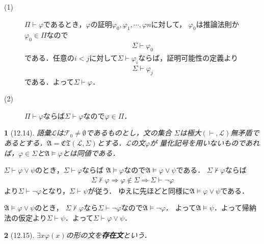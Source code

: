 \documentclass[a4j,10.5pt,oneside,openany]{jsbook}
\theoremstyle{mystyle}
\newtheorem{thm}{\color{DarkMidnightBlue}{定理}}[section]
\newtheorem{dfn}[thm]{\color{PakistanGreen}{定義}}
\begin{document}
	\begin{description}
		\item[(1)] $\Pi \vdash \varphi$であるとき，$\varphi$の証明$\varphi_{0},\varphi_{1},\cdots,\varphi{n}$に対して，
			$\varphi_{0}$は推論法則か$\varphi_{0} \in \Pi$なので
			\begin{align}
				\Sigma \vdash \varphi_{0}
			\end{align}
			である．任意の$i < j$に対して$\Sigma \vdash \varphi_{i}$ならば，証明可能性の定義より
			\begin{align}
				\Sigma \vdash \varphi_{j}
			\end{align}
			である．よって$\Sigma \vdash \varphi$．
			
		\item[(2)] $\Pi \vdash \varphi$ならば$\Sigma \vdash \varphi$なので$\varphi \in \Pi$．
	\end{description}
	
	\begin{screen}
		\begin{thm}[12.14]
			語彙$\mathcal{L}$は$\mathcal{F}_{0} \neq \emptyset$であるものとし，文の集合
			$\Sigma$は極大$(\vdash,\mathcal{L})$無矛盾であるとする．$\mathfrak{A} = 
			\mathfrak{CT}(\mathcal{L},\Sigma)$とする．$\mathcal{L}$の文$\varphi$が
			量化記号を用いないものであれば，$\varphi \in \Sigma$と$\mathfrak{A} \models
			\varphi$とは同値である．
		\end{thm}
	\end{screen}
	
	$\Sigma \vdash \varphi \vee \psi$のとき，$\Sigma \vdash \varphi$ならば
	$\mathfrak{A} \models \varphi$なので$\mathfrak{A} \models \varphi \vee \psi$である．
	$\Sigma \not\vdash \varphi$ならば
	\begin{align}
		\Sigma \not\vdash \varphi \Longrightarrow \varphi \notin \Sigma
		\Longrightarrow \Sigma \vdash \neg \varphi
	\end{align}
	より$\Sigma \vdash \neg \varphi$となり，$\Sigma \vdash \psi$が従う．
	ゆえに先ほどと同様に$\mathfrak{A} \models \varphi \vee \psi$である．
	
	$\mathfrak{A} \models \varphi \vee \psi$のとき，
	$\Sigma \not\vdash \varphi$なら$\Sigma \vdash \neg \varphi$なので$\mathfrak{A} \models \neg \varphi$．
	よって$\mathfrak{A} \models \psi$．よって帰納法の仮定より$\Sigma \vdash \psi$．よって$\Sigma \vdash \varphi \vee \psi$．
	
	\begin{screen}
		\begin{dfn}[12.15]
			$\exists x \varphi(x)$の形の文を{\bf 存在文}という．
		\end{dfn}
	\end{screen}
	
\end{document}
